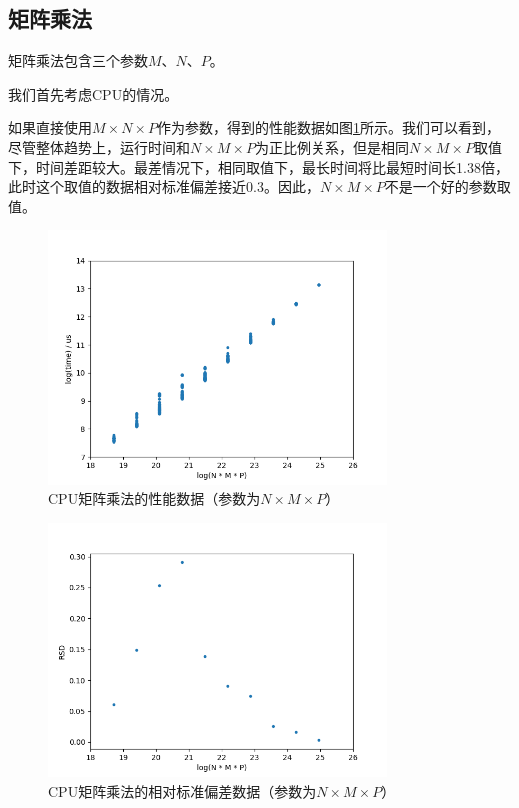 \subsection{矩阵乘法}
\label{ssec:impl_matmul}
    矩阵乘法包含三个参数$ M $、$ N $、$ P $。
    
    我们首先考虑CPU的情况。
    
    如果直接使用$ M \times N \times P $作为参数，得到的性能数据如图\ref{fig:matmul_cpu_nmp}所示。我们可以看到，尽管整体趋势上，运行时间和$ N \times M \times P $为正比例关系，但是相同$ N \times M \times P $取值下，时间差距较大。最差情况下，相同取值下，最长时间将比最短时间长1.38倍，此时这个取值的数据相对标准偏差接近0.3。因此，$ N \times M \times P $不是一个好的参数取值。
    
    \begin{figure}[!htbp]
        \centering
        \includegraphics[width=0.8\textwidth]{figures/matmul_cpu_nmp.png}
        \caption{CPU矩阵乘法的性能数据（参数为$N \times M \times P $）}
        \label{fig:matmul_cpu_nmp}
    \end{figure}
    
    \begin{figure}[!htbp]
        \centering
        \includegraphics[width=0.8\textwidth]{figures/matmul_cpu_nmp_rsd.png}
        \caption{CPU矩阵乘法的相对标准偏差数据（参数为$ N \times M \times P $）}
        \label{fig:matmul_cpu_nmp_rsd}
    \end{figure}
    
